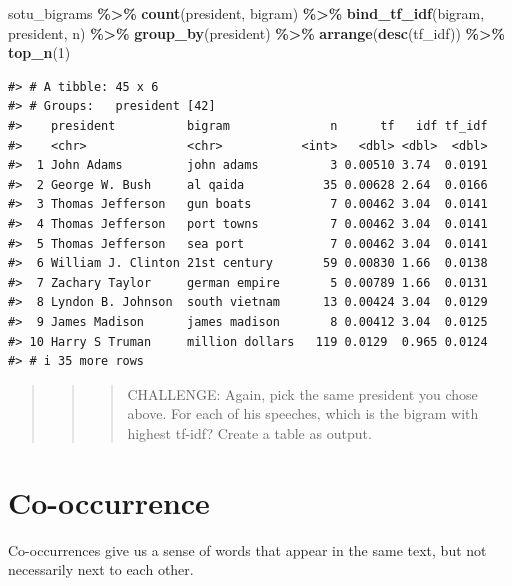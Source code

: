 \documentclass[
]{book}
\newenvironment{Shaded}{\begin{snugshade}}{\end{snugshade}}
\newcommand{\DecValTok}[1]{\textcolor[rgb]{0.00,0.00,0.81}{#1}}
\newcommand{\FunctionTok}[1]{\textcolor[rgb]{0.13,0.29,0.53}{\textbf{#1}}}
\newcommand{\NormalTok}[1]{#1}
\newcommand{\SpecialCharTok}[1]{\textcolor[rgb]{0.81,0.36,0.00}{\textbf{#1}}}
\begin{document}
\begin{Shaded}
\begin{Highlighting}[]
\NormalTok{sotu\_bigrams }\SpecialCharTok{\%\textgreater{}\%}
  \FunctionTok{count}\NormalTok{(president, bigram) }\SpecialCharTok{\%\textgreater{}\%}
  \FunctionTok{bind\_tf\_idf}\NormalTok{(bigram, president, n) }\SpecialCharTok{\%\textgreater{}\%}
  \FunctionTok{group\_by}\NormalTok{(president) }\SpecialCharTok{\%\textgreater{}\%}  
  \FunctionTok{arrange}\NormalTok{(}\FunctionTok{desc}\NormalTok{(tf\_idf)) }\SpecialCharTok{\%\textgreater{}\%} 
  \FunctionTok{top\_n}\NormalTok{(}\DecValTok{1}\NormalTok{)}
\end{Highlighting}
\end{Shaded}

\begin{verbatim}
#> # A tibble: 45 x 6
#> # Groups:   president [42]
#>    president          bigram              n      tf   idf tf_idf
#>    <chr>              <chr>           <int>   <dbl> <dbl>  <dbl>
#>  1 John Adams         john adams          3 0.00510 3.74  0.0191
#>  2 George W. Bush     al qaida           35 0.00628 2.64  0.0166
#>  3 Thomas Jefferson   gun boats           7 0.00462 3.04  0.0141
#>  4 Thomas Jefferson   port towns          7 0.00462 3.04  0.0141
#>  5 Thomas Jefferson   sea port            7 0.00462 3.04  0.0141
#>  6 William J. Clinton 21st century       59 0.00830 1.66  0.0138
#>  7 Zachary Taylor     german empire       5 0.00789 1.66  0.0131
#>  8 Lyndon B. Johnson  south vietnam      13 0.00424 3.04  0.0129
#>  9 James Madison      james madison       8 0.00412 3.04  0.0125
#> 10 Harry S Truman     million dollars   119 0.0129  0.965 0.0124
#> # i 35 more rows
\end{verbatim}

\begin{quote}
\begin{quote}
\begin{quote}
CHALLENGE: Again, pick the same president you chose above. For each of his speeches, which is the bigram with highest tf-idf? Create a table as output.
\end{quote}
\end{quote}
\end{quote}

\section{Co-occurrence}\label{co-occurrence}

Co-occurrences give us a sense of words that appear in the same text, but not necessarily next to each other.
\end{document}

